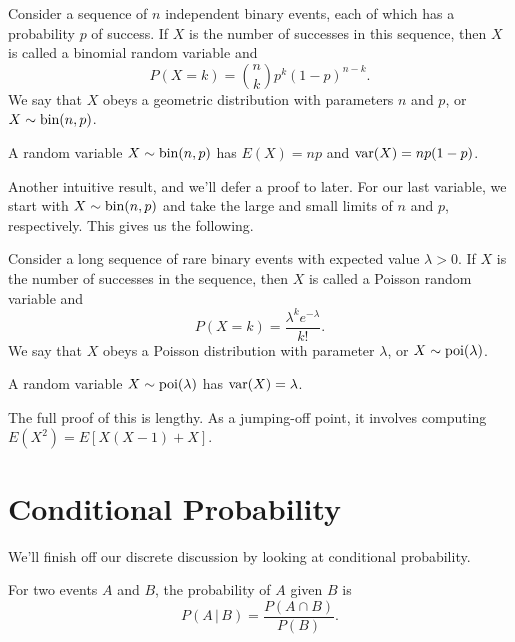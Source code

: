 \documentclass[../m157main.tex]{subfiles}
\begin{document}
\begin{definition}
    Consider a sequence of $n$ independent binary events, each of which has a probability $p$ of success.
    If $X$ is the number of successes in this sequence, then $X$ is called a binomial random variable and
    \[ P(X = k) = \binom{n}{k} p^{k}(1 - p)^{n-k}. \]
    We say that $X$ obeys a geometric distribution with parameters $n$ and $p$, or $X \sim \textrm{bin}(n,p)$.
\end{definition}

\begin{theorem}
    A random variable $X \sim \textrm{bin}(n,p)$ has $E(X) = np$ and $\textrm{var}(X) = np (1-p)$.
\end{theorem}

Another intuitive result, and we'll defer a proof to later.
For our last variable, we start with $X \sim \textrm{bin}(n,p)$ and take the large and small limits of $n$ and $p$, respectively.
This gives us the following.

\begin{definition}
    Consider a long sequence of rare binary events with expected value $\lambda > 0$.
    If $X$ is the number of successes in the sequence, then $X$ is called a Poisson random variable and
    \[ P(X = k) = \frac{\lambda^{k} e^{-\lambda}}{k!}. \]
    We say that $X$ obeys a Poisson distribution with parameter $\lambda$, or $X \sim \textrm{poi}(\lambda)$.
\end{definition}

\begin{theorem}
    A random variable $X \sim \textrm{poi}(\lambda)$ has $\textrm{var}(X) = \lambda$.
\end{theorem}

The full proof of this is lengthy.
As a jumping-off point, it involves computing $E(X^2) = E[X(X-1) + X]$.

\section{Conditional Probability}
We'll finish off our discrete discussion by looking at conditional probability.

\begin{definition}
    For two events $A$ and $B$, the probability of $A$ given $B$ is
    \[ P(A \,|\, B) = \frac{P(A \cap B)}{P(B)}. \]
\end{definition}
\end{document}

